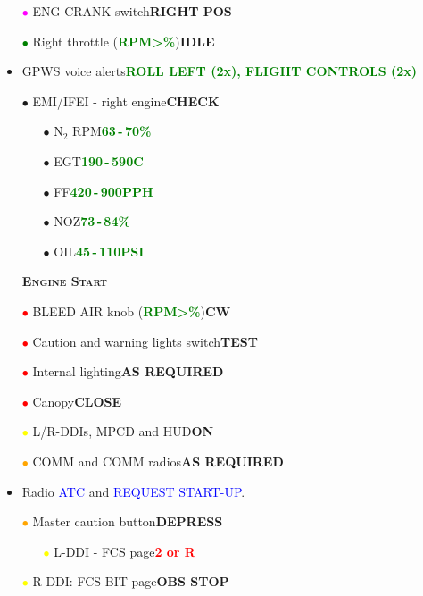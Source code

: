\documentclass[a4paper,12pt,dvipsnames]{letter}
\newcommand{\radio}[1]{\textcolor{blue}{#1}}
\newcommand{\button}[1]{\textbf{#1}}
\newcommand{\degC}{\textdegree{}C}
\newcommand{\ok}[1]{\textcolor{Green}{\textbf{#1}}}
\newcommand{\warn}[1]{\textcolor{Red}{\textbf{#1}}}
\newcommand{\myHead}[1]{{\LARGE\textsc{\textbf{#1}}}}
\newcommand{\bi}{\textcolor{ProcessBlue}{$\bullet$\;}}
\newcommand{\ri}{\textcolor{Red}{$\bullet$\;}}
\newcommand{\gi}{\textcolor{Green}{$\bullet$\;}}
\newcommand{\yi}{\textcolor{Yellow}{$\bullet$\;}}
\newcommand{\mi}{\textcolor{Magenta}{$\bullet$\;}}
\newcommand{\oi}{\textcolor{Orange}{$\bullet$\;}}
\renewcommand{\ni}{\textcolor{Brown}{$\bullet$\;}}
\begin{document}
{\begin{itemize}
 \begin{itemize}
  \item[\ni] APU ACC caution light\dotfill\ok{ON}
  \item[\mi] APU READY light\dotfill\ok{GREEN}
 \end{itemize}
 \item[\mi] ENG CRANK switch\dotfill\button{RIGHT POS}
 \item[\gi] Right throttle (\ok{RPM\;>\%})\dotfill\button{IDLE}
 \item GPWS voice alerts\dotfill\dotfill\ok{ROLL LEFT (2x), FLIGHT CONTROLS (2x)}
 \item[\bi]EMI/IFEI - right engine\dotfill\button{CHECK}
 \begin{itemize}
  \item[\bi] N$_2$ RPM\dotfill\ok{63\,-\,70\%}
  \item[\bi] EGT\dotfill\ok{190\,-\,590\degC}
  \item[\bi] FF\dotfill\ok{420\,-\,900\;PPH}
  \item[\bi] NOZ\dotfill\ok{73\,-\,84\%}
  \item[\bi] OIL\dotfill\ok{45\,-\,110\;PSI}
 \end{itemize}
\end{itemize}
\newpage
\begin{itemize}
 \item[] \myHead{Engine Start} 
 \item[\ri] BLEED AIR knob (\ok{RPM\;>\%})\dotfill\button{CW\textdegree}
 \item[\ri] Caution and warning lights switch\dotfill\button{TEST}
 \item[\ri] Internal lighting\dotfill\button{AS REQUIRED}
 \item[\ri] Canopy\dotfill\button{CLOSE}
 \item[\yi] L/R-DDIs, MPCD and HUD\dotfill\button{ON}
 \item[\oi] COMM and COMM radios\dotfill\button{AS REQUIRED}
 \item Radio \radio{ATC} and \radio{REQUEST START-UP}.
 \item[\oi] Master caution button\dotfill\button{DEPRESS}
 \begin{itemize}
  \item[\yi] L-DDI - FCS page\dotfill\warn{2 or R}
 \end{itemize}
 \item[\yi] R-DDI: FCS BIT page\dotfill\button{OBS STOP}

\end{itemize}}
\end{document}
